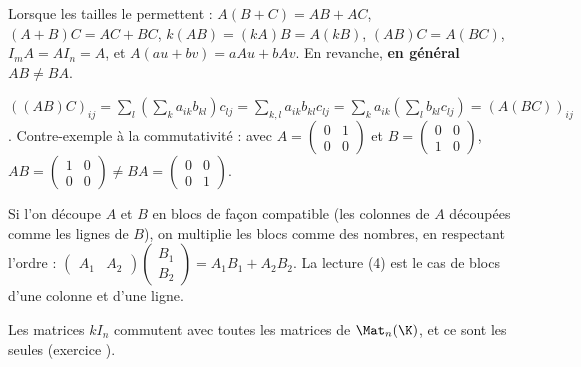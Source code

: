 \begin{proposition}[Règles]\label{prop-regles}
Lorsque les tailles le permettent : $A(B+C)=AB+AC$, $(A+B)C=AC+BC$, $k(AB)=(kA)B=A(kB)$, $(AB)C=A(BC)$, $I_mA=AI_n=A$, et $A(au+bv)=aAu+bAv$. En revanche, \textbf{en général $AB\neq BA$}.
\end{proposition}
\begin{preuve}[Associativité]
$((AB)C)_{ij}=\sum_l\left(\sum_k a_{ik}b_{kl}\right)c_{lj}=\sum_{k,l}a_{ik}b_{kl}c_{lj}=\sum_k a_{ik}\left(\sum_l b_{kl}c_{lj}\right)=(A(BC))_{ij}$. Contre-exemple à la commutativité : avec $A=\begin{pmatrix}0&1\\0&0\end{pmatrix}$ et $B=\begin{pmatrix}0&0\\1&0\end{pmatrix}$, $AB=\begin{pmatrix}1&0\\0&0\end{pmatrix}\neq BA=\begin{pmatrix}0&0\\0&1\end{pmatrix}$.
\end{preuve}
\begin{remarque}
Si l'on découpe $A$ et $B$ en blocs de façon compatible (les colonnes de $A$ découpées comme les lignes de $B$), on multiplie les blocs comme des nombres, en respectant l'ordre : $\begin{pmatrix}A_1&A_2\end{pmatrix}\begin{pmatrix}B_1\\B_2\end{pmatrix}=A_1B_1+A_2B_2$. La lecture (4) est le cas de blocs d'une colonne et d'une ligne.
\end{remarque}
\begin{proposition}
Les matrices $kI_n$ commutent avec toutes les matrices de $\Mat_n(\K)$, et ce sont les seules (exercice ).
\end{proposition}

